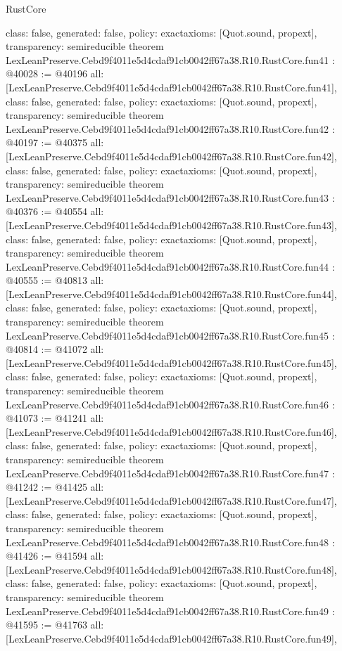 \begin{lexlean}{RustCore}
\begin{coremodule}
{  class: false,
  generated: false,
  policy: exact{axioms: [Quot.sound, propext]},
  transparency: semireducible
}
theorem LexLeanPreserve.Cebd9f4011e5d4cdaf91cb0042ff67a38.R10.RustCore.fun41 : @40028 := @40196 {
  all: [LexLeanPreserve.Cebd9f4011e5d4cdaf91cb0042ff67a38.R10.RustCore.fun41],
  class: false,
  generated: false,
  policy: exact{axioms: [Quot.sound, propext]},
  transparency: semireducible
}
theorem LexLeanPreserve.Cebd9f4011e5d4cdaf91cb0042ff67a38.R10.RustCore.fun42 : @40197 := @40375 {
  all: [LexLeanPreserve.Cebd9f4011e5d4cdaf91cb0042ff67a38.R10.RustCore.fun42],
  class: false,
  generated: false,
  policy: exact{axioms: [Quot.sound, propext]},
  transparency: semireducible
}
theorem LexLeanPreserve.Cebd9f4011e5d4cdaf91cb0042ff67a38.R10.RustCore.fun43 : @40376 := @40554 {
  all: [LexLeanPreserve.Cebd9f4011e5d4cdaf91cb0042ff67a38.R10.RustCore.fun43],
  class: false,
  generated: false,
  policy: exact{axioms: [Quot.sound, propext]},
  transparency: semireducible
}
theorem LexLeanPreserve.Cebd9f4011e5d4cdaf91cb0042ff67a38.R10.RustCore.fun44 : @40555 := @40813 {
  all: [LexLeanPreserve.Cebd9f4011e5d4cdaf91cb0042ff67a38.R10.RustCore.fun44],
  class: false,
  generated: false,
  policy: exact{axioms: [Quot.sound, propext]},
  transparency: semireducible
}
theorem LexLeanPreserve.Cebd9f4011e5d4cdaf91cb0042ff67a38.R10.RustCore.fun45 : @40814 := @41072 {
  all: [LexLeanPreserve.Cebd9f4011e5d4cdaf91cb0042ff67a38.R10.RustCore.fun45],
  class: false,
  generated: false,
  policy: exact{axioms: [Quot.sound, propext]},
  transparency: semireducible
}
theorem LexLeanPreserve.Cebd9f4011e5d4cdaf91cb0042ff67a38.R10.RustCore.fun46 : @41073 := @41241 {
  all: [LexLeanPreserve.Cebd9f4011e5d4cdaf91cb0042ff67a38.R10.RustCore.fun46],
  class: false,
  generated: false,
  policy: exact{axioms: [Quot.sound, propext]},
  transparency: semireducible
}
theorem LexLeanPreserve.Cebd9f4011e5d4cdaf91cb0042ff67a38.R10.RustCore.fun47 : @41242 := @41425 {
  all: [LexLeanPreserve.Cebd9f4011e5d4cdaf91cb0042ff67a38.R10.RustCore.fun47],
  class: false,
  generated: false,
  policy: exact{axioms: [Quot.sound, propext]},
  transparency: semireducible
}
theorem LexLeanPreserve.Cebd9f4011e5d4cdaf91cb0042ff67a38.R10.RustCore.fun48 : @41426 := @41594 {
  all: [LexLeanPreserve.Cebd9f4011e5d4cdaf91cb0042ff67a38.R10.RustCore.fun48],
  class: false,
  generated: false,
  policy: exact{axioms: [Quot.sound, propext]},
  transparency: semireducible
}
theorem LexLeanPreserve.Cebd9f4011e5d4cdaf91cb0042ff67a38.R10.RustCore.fun49 : @41595 := @41763 {
  all: [LexLeanPreserve.Cebd9f4011e5d4cdaf91cb0042ff67a38.R10.RustCore.fun49],
}
\end{coremodule}
\end{lexlean}
